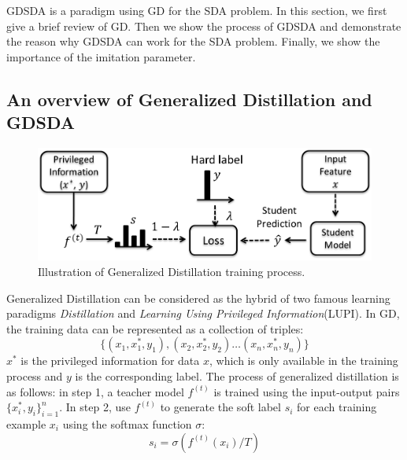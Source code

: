 GDSDA is a paradigm using GD for the SDA problem. In this section, we first give a brief review of GD. Then we show the process of GDSDA and demonstrate the reason why GDSDA can work for the SDA problem. Finally, we show the importance of the imitation parameter. 

\subsection{An overview of Generalized Distillation and GDSDA}
\begin{figure}\label{fig:gd}
	\centering
	\includegraphics[scale=.35]{figure/GD.png}
	\caption{Illustration of Generalized Distillation training process.}
\end{figure}
%
%
{Generalized Distillation} can be considered as the hybrid of two famous learning paradigms \textit{Distillation}\cite{hinton2015distilling} and \textit{Learning Using Privileged Information}(LUPI)\cite{vapnik2015learning}.
In GD, the training data can be represented as a collection of triples:
\[\{\left(x_1,x_1^*,y_1\right),\left(x_2,x_2^*,y_2\right) \dots \left(x_n,x_n^*,y_n\right)\}\]
$x^*$ is the privileged information for data $x$, which is only available in the training process and $y$ is the corresponding label. 
The process of generalized distillation is as follows: in step 1, a teacher model ${f}^{(t)}$ is trained using the input-output pairs $\{x^*_i,y_i\}_{i=1}^n$. In step 2, use ${f}^{(t)}$ to generate the soft label $s_i$ for each training example $x_i$ using the softmax function $\sigma$:
\begin{equation}\label{eq:softmax_T}
s_i=\sigma(f^{(t)}(x_i)/T)
\end{equation}
